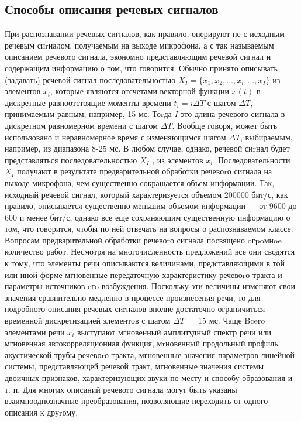 \documentclass[14pt,russian,utf8,nocolumnsxix]{extarticle}
\begin{document}
\subsection{Способы описания речевых сигналов}

При распознавании речевых сигналов, как правило, оперируют не с исходным речевым сиrналом, получаемым на выходе микрофона, а с так называемым описанием речевоrо сигнала, экономно представляющим речевой сигнал и содержащим информацию о том, что говорится. 
Обычно принято описывать (задавать) речевой сигнал последовательностью $X_{I}=\{x_{1},x_{2},\dots,x_{i},\dots,x_{I}\}$ из элементов $x_{i}$, которые являются отсчетами векторной функции $x(t)$ в дискретные равноотстоящие моменты времени $t_{i}=i\Delta T$ с шагом $\Delta T$, принимаемым равным, например, 15 мс. Тоrда $I$ это длина речевого сигнала в дискретном равномерном времени с шагом $\Delta T$. Вообще говоря, может быть использовано и неравномерное время с изменяющимся шагом $\Delta T$, выбираемым, например, из диапазона 8-25 мс. В любом случае, однако, речевой сиrнал будет представляться последовательностью $X_{I}$ , из элементов $x_{i}$. 
Последовательности $X_{I}$ получают в результате предварительной обработки речевоrо сигнала на выходе микрофона, чем существенно сокращается объем информации. Так, исходный речевой сигнал, который характеризуется объемом 200000 бит/с, как правило, описывается существенно меньшим объемом информации --- от 9600 до 600 и менее бит/с, однако все еще сохраняющим существенную информацию о том, что говорится, чтобы по ней отвечать на вопросы о распознаваемом классе. 
Вопросам предварительной обработки речевоrо сигнала посвящено oгpoмнoe количество работ. Несмотря на многочисленность предложений все они сводятся к тому, что элементы речи описываются величинами, представляющими в той или иной форме мгновенные передаточную характеристику речевоrо тракта и параметры источников eгo возбуждения. Поскольку эти величины изменяют свои значения сравнительно медленно в процессе произнесения речи, то для подробноrо описания речевых сиrналов вполне достаточно ограничиться временной дискретизацией элементов с шаrом $\Delta T=$ 15 мс. 
Чаще Bcero элементами речи $x_{i}$ выступают мгновенный амплитудный спектр речи или мгновенная автокорреляционная функция, мrновенный продольный профиль акустической трубы речевоrо тракта, мгновенные значения параметров линейной системы, представляющей речевой тракт, мгновенные значения системы двоичных признаков, характеризующих звуки по месту и способу образования и т. п. Для многих описаний речевоrо сигнала могут быть указаны взаимнооднозначные преобразования, позволяющие переходить от одного описания к друrому. 
\end{document}
